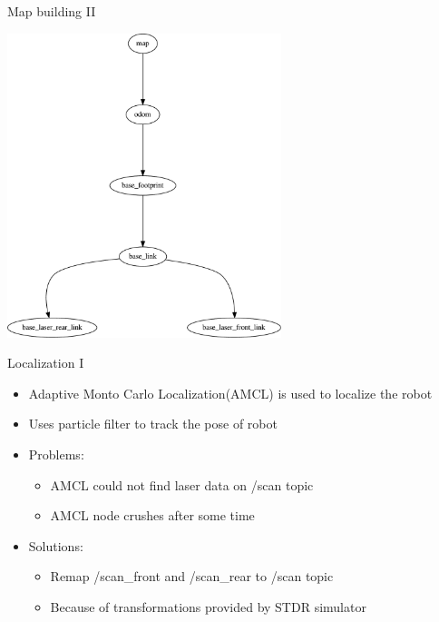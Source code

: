 \begin{frame}{Map building II}
    \begin{center}
    \includegraphics[width=0.6\textwidth]{gfx/frames_cleaned.pdf}
    \end{center}
\end{frame}
\begin{frame}{Localization I}
    \begin{itemize}
        \item Adaptive Monto Carlo Localization(AMCL) is used to localize the robot
        \item Uses particle filter to track the pose of robot

        \item Problems:
        \begin{itemize}
            \item AMCL could not find laser data on /scan topic
            \item AMCL node crushes after some time
            
        \end{itemize}
        \item Solutions:
        \begin{itemize}
            \item Remap /scan\_front and /scan\_rear to /scan topic
            \item Because of transformations provided by STDR simulator
            
        \end{itemize}
    \end{itemize}
\end{frame}